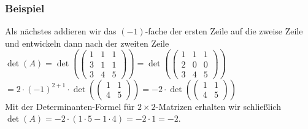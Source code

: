 %
%
\begin{frame}\frametitle{Beispiel}
Als nächstes addieren wir das $(-1)$-fache der ersten Zeile auf die zweise Zeile und entwickeln dann nach der zweiten Zeile\\\vfill
$\det(A)=\det(\begin{pmatrix} 1&1&1 \\ 3&1&1 \\ 3&4&5\end{pmatrix})=\det(\begin{pmatrix} 1&1&1 \\ 2&0&0 \\ 3&4&5\end{pmatrix})$\\\pause
\hspace{11.75mm}$=2\cdot(-1)^{2+1}\cdot\det(\begin{pmatrix} 1&1 \\ 4 & 5 \end{pmatrix})=-2\cdot\det(\begin{pmatrix} 1&1 \\ 4 & 5 \end{pmatrix})$ \pause \\\vfill
Mit der Determinanten-Formel für $2\times2$-Matrizen erhalten wir schließlich\\ \vfill
$\det(A)=-2\cdot(1\cdot5 - 1\cdot 4)=-2 \cdot 1 =-2$.

\end{frame}
%
